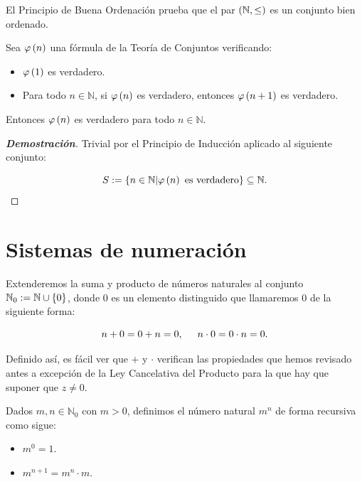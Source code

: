 El Principio de Buena Ordenación prueba que el par $\left(\mathbb{N},\leq\right)$ es un conjunto bien ordenado.

\begin{proposition}
\rm Sea $\varphi\left(n\right)$ una fórmula de la Teoría de Conjuntos verificando:
\begin{itemize}
    \item[(i)] $\varphi\left(1\right)$ es verdadero.
    \item[(ii)] Para todo $n\in\mathbb{N}$, si $\varphi\left(n\right)$ es verdadero, entonces $\varphi\left(n+1\right)$ es verdadero.
\end{itemize}

Entonces $\varphi\left(n\right)$ es verdadero para todo $n\in\mathbb{N}$.
\begin{proof}[\rm\textbf{Demostración}]
  \rm Trivial por el Principio de Inducción aplicado al siguiente conjunto:
  
  \begin{equation}
    S:=\left\{n\in\mathbb{N}\middle|\varphi\left(n\right)\text{ es verdadero}\right\}\subseteq\mathbb{N}.
  \end{equation}
\end{proof}
\end{proposition}

\section{Sistemas de numeración}

Extenderemos la suma y producto de números naturales al conjunto $\mathbb{N}_0:=\mathbb{N}\cup\left\{0\right\}$, donde $0$ es un elemento distinguido que llamaremos $0$ de la siguiente forma:

\begin{equation}
  n+0=0+n=0,\hspace{0.5cm}n\cdot 0=0\cdot n=0.
\end{equation}

Definido así, es fácil ver que $+$ y $\cdot$ verifican las propiedades que hemos revisado antes a excepción de la Ley Cancelativa del Producto para la que hay que suponer que $z\neq 0$. 

\begin{definition}
  \rm Dados $m,n\in\mathbb{N}_0$ con $m>0$, definimos el número natural $m^n$ de forma recursiva como sigue:

  \begin{itemize}
    \item[1.] $m^0=1$.
    \item[2.] $m^{n+1}=m^n\cdot m$.
  \end{itemize}
\end{definition}

